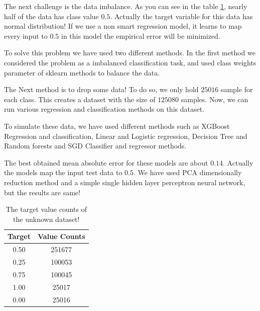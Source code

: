 \documentclass[11pt]{article}
\begin{document}
The next challenge is the data imbalance. As you can see in the table \ref{tbl:6}, nearly half of the data has class value $0.5$. Actually the target variable for this data has normal distribution! If we use a non smart regression model, it learns to map every input to $0.5$ in this model the empirical error will be minimized.

To solve this problem we have used two different methods. In the first method we considered the problem as a imbalanced classification task, and used class weights parameter of sklearn methods to balance the data.

The Next method is to drop some data! To do so, we only hold $25016$ sample for each class. This creates a dataset with the size of $125080$ samples. Now, we can run various regression and classification methods on this dataset.

To simulate these data, we have used different methods such as XGBoost Regression and classification, Linear and Logistic regression, Decision Tree and Random forests and SGD Classifier and regressor methods. 

The best obtained mean absolute error for these models are about $0.14$. Actually the models map the input test data to $0.5$. We have used PCA dimensionally reduction method and a simple single hidden layer perceptron neural network, but the results are same!
\begin{table}[]
\centering
\begin{tabular}{@{}cc@{}}
\toprule
Target & Value Counts \\ \midrule
0.50 & 251677 \\
0.25 & 100053 \\
0.75 & 100045 \\
1.00 & 25017 \\
0.00 & 25016 \\ \bottomrule
\end{tabular}
\caption{The target value counts of the unknown dataset!}
\label{tbl:6}
\end{table}
\end{document}
